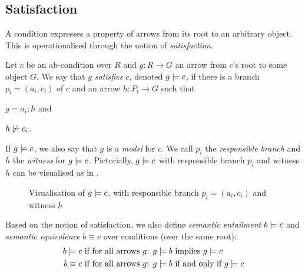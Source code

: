 \subsection{Satisfaction}

A condition expresses a property of arrows from its root to an arbitrary object. This is operationalised through the notion of \emph{satisfaction}.

\begin{definition}
  Let $c$ be an ab-condition over $R$ and $g:R\to G$ an arrow from $c$'s root to some object $G$. We say that \emph{$g$ satisfies $c$}, denoted $g\models c$, if there is a branch $p_i=(a_i,c_i)$ of $c$ and an arrow $h:P_i\to G$ such that
  \begin{enumerate*}
  \item $g=a_i;h$ and
  \item $h\not\models c_i$.
  \end{enumerate*}
\end{definition}
%
If $g\models c$, we also say that $g$ is a \emph{model} for $c$. We call $p_i$ the \emph{responsible branch} and $h$ the \emph{witness} for $g\models c$. Pictorially, $g\models c$ with responsible branch $p_i$ and witness $h$ can be visualised as in .
%
\begin{figure}
  \centering
  
  \caption{Visualisation of $g\models c$, with responsible branch $p_i=(a_i,c_i)$ and witness $h$}
\end{figure}

 Based on the notion of satisfaction, we also define \emph{semantic entailment} $b\models c$ and \emph{semantic equivalence} $b\equiv c$ over conditions (over the same root):
%
\begin{align*}
b \models c & \text{ if for all arrows $g$: } g\models b \text{ implies } g\models c \\
b \equiv c & \text{ if for all arrows $g$: } g\models b \text{ if and only if } g\models c 
\end{align*}

